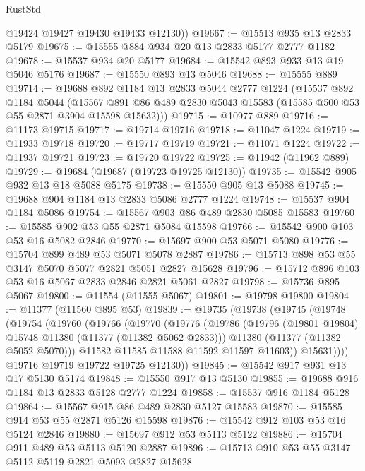 \begin{lexlean}{RustStd}
\begin{coremodule}
        @19424
        @19427
        @19430
        @19433
        @12130))
@19667 := @15513 @935 @13 @2833 @5179
@19675 := @15555 @884 @934 @20 @13 @2833 @5177 @2777 @1182
@19678 := @15537 @934 @20 @5177
@19684 := @15542 @893 @933 @13 @19 @5046 @5176
@19687 := @15550 @893 @13 @5046
@19688 := @15555 @889
@19714 := @19688
    @892
    @1184
    @13
    @2833
    @5044
    @2777
    @1224
    (@15537
      @892
      @1184
      @5044
      (@15567 @891 @86 @489 @2830 @5043 @15583 (@15585 @500 @53 @55 @2871 @3904 @15598 @15632)))
@19715 := @10977 @889
@19716 := @11173 @19715
@19717 := @19714 @19716
@19718 := @11047 @1224
@19719 := @11933 @19718
@19720 := @19717 @19719
@19721 := @11071 @1224
@19722 := @11937 @19721
@19723 := @19720 @19722
@19725 := @11942 (@11962 @889)
@19729 := @19684 (@19687 (@19723 @19725 @12130))
@19735 := @15542 @905 @932 @13 @18 @5088 @5175
@19738 := @15550 @905 @13 @5088
@19745 := @19688 @904 @1184 @13 @2833 @5086 @2777 @1224
@19748 := @15537 @904 @1184 @5086
@19754 := @15567 @903 @86 @489 @2830 @5085 @15583
@19760 := @15585 @902 @53 @55 @2871 @5084 @15598
@19766 := @15542 @900 @103 @53 @16 @5082 @2846
@19770 := @15697 @900 @53 @5071 @5080
@19776 := @15704 @899 @489 @53 @5071 @5078 @2887
@19786 := @15713 @898 @53 @55 @3147 @5070 @5077 @2821 @5051 @2827 @15628
@19796 := @15712 @896 @103 @53 @16 @5067 @2833 @2846 @2821 @5061 @2827
@19798 := @15736 @895 @5067
@19800 := @11554 (@11555 @5067)
@19801 := @19798 @19800
@19804 := @11377 (@11560 @895 @53)
@19839 := @19735
    (@19738
      (@19745
        (@19748
          (@19754
            (@19760
              (@19766
                (@19770
                  (@19776
                    (@19786
                      (@19796 (@19801 @19804) @15748 @11380 (@11377 (@11382 @5062 @2833)))
                      @11380
                      (@11377 (@11382 @5052 @5070)))
                    @11582
                    @11585
                    @11588
                    @11592
                    @11597
                    @11603))
                @15631))))
        @19716
        @19719
        @19722
        @19725
        @12130))
@19845 := @15542 @917 @931 @13 @17 @5130 @5174
@19848 := @15550 @917 @13 @5130
@19855 := @19688 @916 @1184 @13 @2833 @5128 @2777 @1224
@19858 := @15537 @916 @1184 @5128
@19864 := @15567 @915 @86 @489 @2830 @5127 @15583
@19870 := @15585 @914 @53 @55 @2871 @5126 @15598
@19876 := @15542 @912 @103 @53 @16 @5124 @2846
@19880 := @15697 @912 @53 @5113 @5122
@19886 := @15704 @911 @489 @53 @5113 @5120 @2887
@19896 := @15713 @910 @53 @55 @3147 @5112 @5119 @2821 @5093 @2827 @15628

\end{coremodule}
\end{lexlean}
